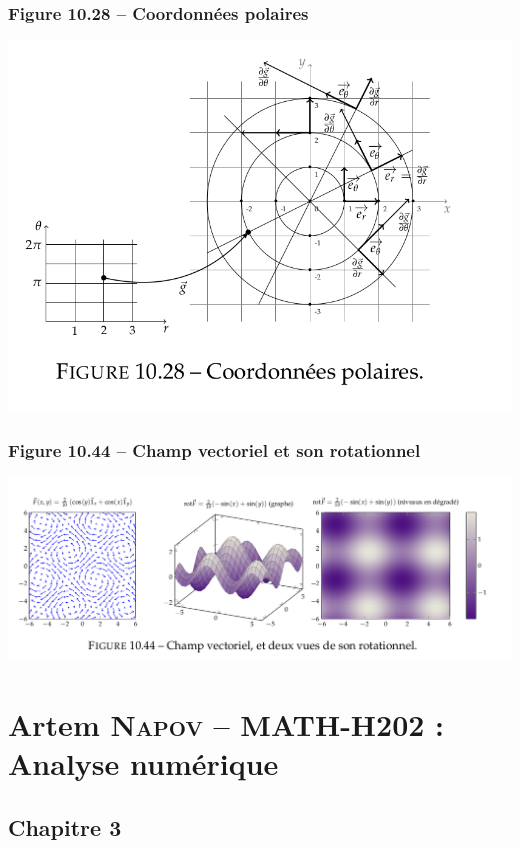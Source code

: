 \documentclass[12pt, a4paper]{article}
\begin{document}
\subsubsection{Figure 10.28 -- Coordonnées polaires}
\begin{center}
\includegraphics[scale=0.4]{images/MATH-H2000_10_28}
\end{center}
\subsubsection{Figure 10.44 -- Champ vectoriel et son rotationnel}
\begin{center}
\includegraphics[scale=0.4]{images/MATH-H2000_10_44}
\end{center}



\section{Artem \textsc{Napov} -- MATH-H202 : Analyse numérique}
\subsection{Chapitre 3}
\end{document}
